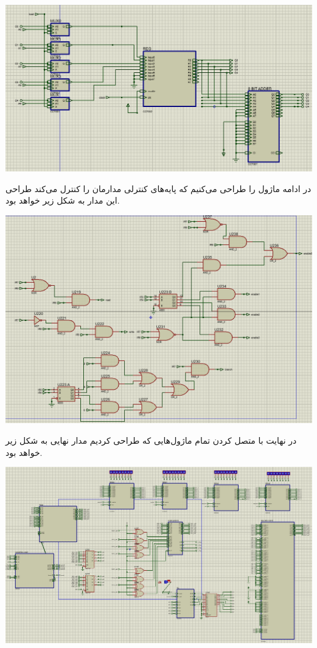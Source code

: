 \includegraphics[width=18cm]{figures/PC.png}

\pagebreak 

در ادامه ماژول
را طراحی می‌کنیم
که پایه‌های کنترلی مدارمان را کنترل می‌کند
طراحی این مدار به شکل زیر خواهد بود.

\includegraphics[width=18cm]{figures/CU.png}

در نهایت با متصل کردن تمام ماژول‌هایی که طراحی کردیم مدار نهایی به شکل
زیر خواهد بود.

\includegraphics[width=18cm]{figures/all.png}

